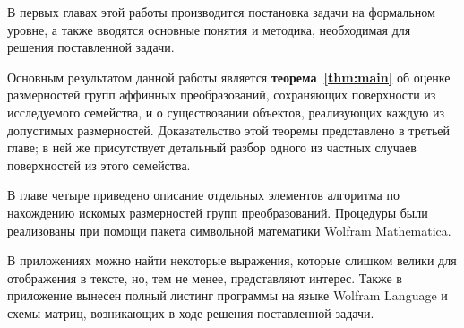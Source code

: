 \documentclass[../main.tex]{subfiles}
\begin{document}
В первых главах этой работы производится постановка задачи на формальном уровне, а также вводятся основные понятия и методика, необходимая для решения поставленной задачи.

Основным результатом данной работы является \textbf{теорема~\ref{thm:main}} об оценке размерностей групп аффинных преобразований, сохраняющих поверхности из исследуемого семейства, и о существовании объектов, реализующих каждую из допустимых размерностей. Доказательство этой теоремы представлено в третьей главе; в ней же присутствует детальный разбор одного из частных случаев поверхностей из этого семейства.

В главе четыре приведено описание отдельных элементов алгоритма по нахождению искомых размерностей групп преобразований. Процедуры были реализованы при помощи пакета символьной математики {\ttfamily Wolfram Mathematica}.

В приложениях можно найти некоторые выражения, которые слишком велики для отображения в тексте, но, тем не менее, представляют интерес. Также в приложение вынесен полный листинг программы на языке {\ttfamily Wolfram Language} и схемы матриц, возникающих в ходе решения поставленной задачи.
\end{document}

